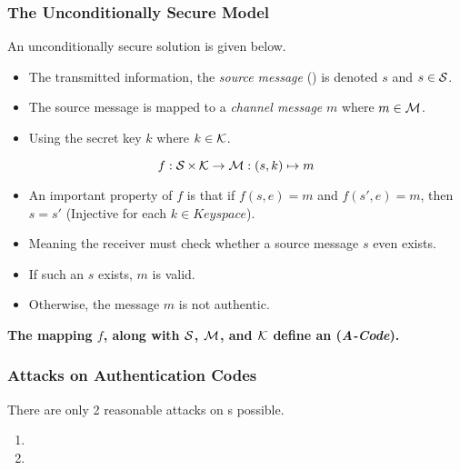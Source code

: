 \subsubsection{The Unconditionally Secure Model}\label{subsubsec:Authentication_Code_Unconditionally_Secure_Model}
An unconditionally secure solution is given below.
\begin{itemize}[noitemsep]
\item The transmitted information, the \emph{source message} () is denoted $s$ and $s \in \operatorname{\mathcal{S}}$.
\item The source message is mapped to a \emph{channel message} $m$ where $m \in \operatorname{\mathcal{M}}$.
\item Using the secret key $k$ where $k \in \operatorname{\mathcal{K}}$.
\end{itemize}

\begin{equation}\label{eq:Unconditional_Authentication_Code}
  f : \operatorname{\mathcal{S}} \times \operatorname{\mathcal{K}} \rightarrow \mathcal{M} : (s, k) \mapsto m
\end{equation}
\begin{itemize}[noitemsep]
\item An important property of $f$ is that if $f(s, e) = m$ and $f(s', e) = m$, then $s = s'$ (Injective for each $k \in Keyspace$).
\item Meaning the receiver must check whether a source message $s$ even exists.
\item If such an $s$ exists, $m$ is valid.
\item Otherwise, the message $m$ is not authentic.
\end{itemize}

\begin{large}
  \textbf{The mapping $f$, along with $\operatorname{\mathcal{S}}$, $\operatorname{\mathcal{M}}$, and $\operatorname{\mathcal{K}}$ define an  (\emph{A-Code}).}
\end{large}

\subsubsection{Attacks on Authentication Codes}\label{subsubsec:Attacks_Authentication_Codes}
There are only 2 reasonable attacks on s possible.
\begin{enumerate}[noitemsep]
\item {}
\item {}
\end{enumerate}

